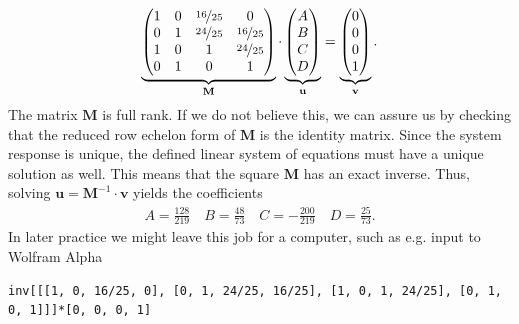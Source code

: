 \documentclass[11pt,a4paper,DIV=12]{scrartcl}
\begin{document}
%
%
%
\begin{align}
\underbrace{
\begin{pmatrix}
1 & 0 & \nicefrac{16}{25} & 0\\
0 & 1 & \nicefrac{24}{25} & \nicefrac{16}{25}\\
1 & 0 & 1 & \nicefrac{24}{25}\\
0 & 1 & 0 & 1
\end{pmatrix}
}_{\mathbf{M}}
\cdot
\underbrace{
\begin{pmatrix}
A \\
B\\
C\\
D
\end{pmatrix}
}_{\mathbf{u}}
=
\underbrace{
\begin{pmatrix}
0\\
0\\
0\\
1
\end{pmatrix}
}_{\mathbf{v}}
.
\end{align}
%
The matrix $\mathbf{M}$ is full rank.
%
If we do not believe this, we can assure us by checking that the reduced row echelon
form of $\mathbf{M}$ is the identity matrix.
%
Since the system response is unique, the defined linear system of equations must
have a unique solution as well.
%
This means that the square $\mathbf{M}$ has an exact inverse.
%
Thus, solving $\mathbf{u} = \mathbf{M}^{-1} \cdot \mathbf{v}$ yields the coefficients
\begin{align}
\label{eq:coeffABCDsinLaplace}
  A = \frac{128}{219}
  \quad B = \frac{48}{73}
  \quad C = -\frac{200}{219}
  \quad D = \frac{25}{73}.
\end{align}
%
In later practice
we might leave this job for a computer, such as e.g. input to Wolfram Alpha
\begin{verbatim}
inv[[[1, 0, 16/25, 0], [0, 1, 24/25, 16/25], [1, 0, 1, 24/25], [0, 1, 0, 1]]]*[0, 0, 0, 1]
\end{verbatim}
\end{document}
